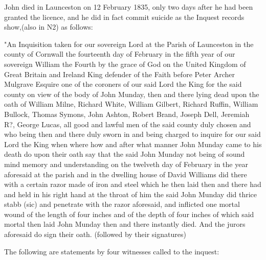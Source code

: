 John died in Launceston on 12 February 1835, only two days after he had been granted the licence, and he did in fact commit suicide as the Inquest records show,(also in N2) as follows:

"An Inquisition taken for our sovereign Lord at the Parish of Launceston in the county of Cornwall the fourteenth day of February in the fifth year of our sovereign William the Fourth by the grace of God on the United Kingdom of Great Britain and Ireland King defender of the Faith before Peter Archer Mulgrave Esquire one of the coroners of our said Lord the King for the said county on view of the body of John Munday, then and there lying dead upon the oath of William Milne, Richard White, William Gilbert, Richard Ruffin, William Bullock, Thomas Symons, John Ashton, Robert Brand, Joseph Dell, Jeremiah R?, George Lucas, all good and lawful men of the said county duly chosen and who being then and there duly sworn in and being charged to inquire for our said Lord the King when where how and after what manner John Munday came to his death do upon their oath say that the said John Munday not being of sound mind memory and understanding on the twelveth day of February in the year aforesaid at the parish and in the dwelling house of David Williams did there with a certain razor made of iron and steel which he then laid then and there had and held in his right hand at the throat of him the said John Munday did thrice stabb (sic) and penetrate with the razor aforesaid, and inflicted one mortal wound of the length of four inches and of the depth of four inches of which said mortal then laid John Munday then and there instantly died. And the jurors aforesaid do sign their oath. (followed by their signatures)

The following are statements by four witnesses called to the inquest:

